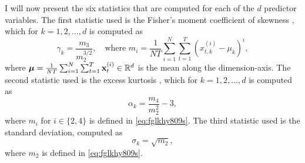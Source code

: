 \documentclass{statsmsc}
\begin{document}
{%
I will now present the six statistics that are computed
for each of the $d$ predictor variables.
The first statistic used is the Fisher's moment
coefficient of skewness \citep{shape}, which for $k=1,2,\dots,d$ is computed as
\begin{equation}\label{eq:fglkhy809s}
    \gamma_k=\frac{m_3}{m_2^{3/2}}, \quad \textrm{where }
    m_i=  \frac{1}{NT} \sum^{N}_{i=1} \sum^{T}_{t=1} \left(x^{(i)}_{t,k}-\mu_k \right)^i,
\end{equation}
where $\bm{\mu}=\frac{1}{NT}\sum^{N}_{i=1} \sum^{T}_{t=1} \mathbf{x}^{(i)}_t \in \mathbb{R}^d$ is the mean along the dimension-axis.
The second statistic used is the excess kurtosis \citep{shape}, which for $k=1,2,\dots,d$ is computed as
\begin{equation}
    \alpha_k=\frac{m_4}{m_2^2}-3,
\end{equation}
where $m_i$ for $i\in \{2,4\}$ is defined in  \cref{eq:fglkhy809s}.
The third statistic used is the standard deviation, computed as
\begin{equation}
    \sigma_k=\sqrt{m_2},
\end{equation}
where $m_2$ is defined in \cref{eq:fglkhy809s}.

}
\end{document}
